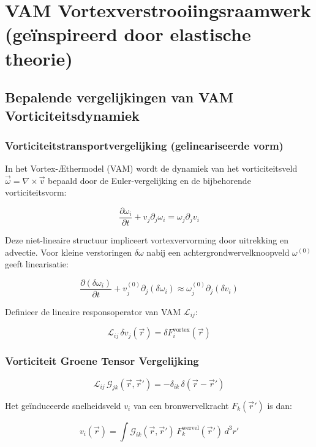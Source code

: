 
\section{VAM Vortexverstrooiingsraamwerk (geïnspireerd door elastische theorie)}

\subsection{Bepalende vergelijkingen van VAM Vorticiteitsdynamiek}

\subsubsection*{Vorticiteitstransportvergelijking (gelineariseerde vorm)}

In het Vortex-Æthermodel (VAM) wordt de dynamiek van het vorticiteitsveld \(\vec{\omega} = \nabla \times \vec{v}\) bepaald door de Euler-vergelijking en de bijbehorende vorticiteitsvorm:

\[
\frac{\partial \omega_i}{\partial t} + v_j \partial_j \omega_i = \omega_j \partial_j v_i
\]

Deze niet-lineaire structuur impliceert vortexvervorming door uitrekking en advectie. Voor kleine verstoringen \(\delta\omega\) nabij een achtergrondwervelknoopveld \(\omega^{(0)}\) geeft linearisatie:

\[
\frac{\partial (\delta \omega_i)}{\partial t} + v_j^{(0)} \partial_j (\delta \omega_i) \approx \omega_j^{(0)} \partial_j (\delta v_i)
\]

Definieer de lineaire responsoperator van VAM \(\mathcal{L}_{ij}\):

\[
\mathcal{L}_{ij} \, \delta v_j(\vec{r}) = \delta F_i^{\text{vortex}}(\vec{r})
\]

\subsubsection*{Vorticiteit Groene Tensor Vergelijking}

\[
\mathcal{L}_{ij} \, \mathcal{G}_{jk}(\vec{r}, \vec{r}') = -\delta_{ik} \, \delta(\vec{r} - \vec{r}')
\]

Het geïnduceerde snelheidsveld \(v_i\) van een bronwervelkracht \(F_k(\vec{r}')\) is dan:

\[
v_i(\vec{r}) = \int \mathcal{G}_{ik}(\vec{r}, \vec{r}') \, F_k^{\text{wervel}}(\vec{r}') \, d^3 r'
\]

